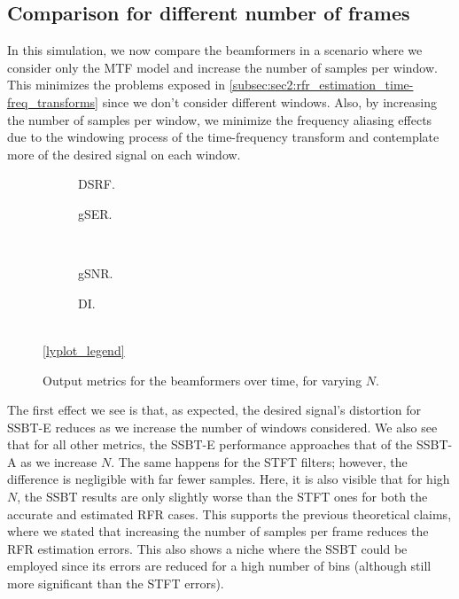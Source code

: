 
\subsection{Comparison for different number of frames}

In this simulation, we now compare the beamformers in a scenario where we consider only the MTF model and increase the number of samples per window. This minimizes the problems exposed in \cref{subsec:sec2:rfr_estimation_time-freq_transforms} since we don't consider different windows. Also, by increasing the number of samples per window, we minimize the frequency aliasing effects due to the windowing process of the time-frequency transform and contemplate more of the desired signal on each window.
\begin{figure}[H]
	\centering
	\begin{subfigure}{0.49\textwidth}
		\centering
		
		\caption{DSRF.}
		\label{subfig:lineplot__DSRF__N_var__iSER_n15__Ly_1}
	\end{subfigure}\hfill
	\begin{subfigure}{0.49\textwidth}
		\centering
		
		\caption{gSER.}
		\label{subfig:lineplot__gSER__N_var__iSER_n15__Ly_1}
	\end{subfigure}\\[1em]
	\begin{subfigure}{0.49\textwidth}
		\centering
		
		\caption{gSNR.}
		\label{subfig:lineplot__gSNR__N_var__iSER_n15__Ly_1}
	\end{subfigure}\hfill
	\begin{subfigure}{0.49\textwidth}
		\centering
		
		\caption{DI.}
		\label{subfig:lineplot__DI__N_var__iSER_n15__Ly_1}
	\end{subfigure}\\[1em]
	\ref*{lyplot_legend}
	\caption{Output metrics for the beamformers over time, for varying $N$.}
	\label{fig:lineplot__N_var__iSER_n15__Ly_1}
\end{figure}

The first effect we see is that, as expected, the desired signal's distortion for SSBT-E reduces as we increase the number of windows considered. We also see that for all other metrics, the SSBT-E performance approaches that of the SSBT-A as we increase $N$. The same happens for the STFT filters; however, the difference is negligible with far fewer samples. Here, it is also visible that for high $N$, the SSBT results are only slightly worse than the STFT ones for both the accurate and estimated RFR cases. This supports the previous theoretical claims, where we stated that increasing the number of samples per frame reduces the RFR estimation errors. This also shows a niche where the SSBT could be employed since its errors are reduced for a high number of bins (although still more significant than the STFT errors).

